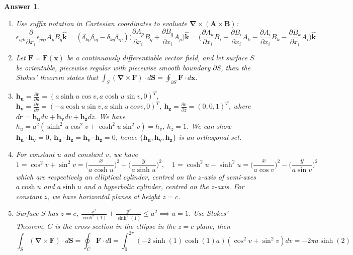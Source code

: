 \documentclass[a4paper]{article}
\newtheorem{ans}{Answer}[section]
\theoremstyle{new}
\begin{document}
\begin{ans}\leavevmode
\begin{enumerate}[label=(\alph*)]
    \item Use suffix notation in Cartesian coordinates to evaluate $\boldsymbol{\nabla}\times(\mathbf{A}\times\mathbf{B})$:
$$\epsilon_{ijk}\frac{\partial}{\partial x_i}\epsilon_{pqj}A_pB_q\mathbf{\hat{k}}=(\delta_{kp}\delta_{iq}-\delta_{kq}\delta_{ip})\bigg(\frac{\partial A_p}{\partial x_i}B_q+\frac{\partial B_q}{\partial x_i}A_p\bigg)\mathbf{\hat{k}}=\bigg(\frac{\partial A_k}{\partial x_i}B_i+\frac{\partial B_i}{\partial x_i}A_k-\frac{\partial A_i}{\partial x_i}B_k-\frac{\partial B_k}{\partial x_i}A_i\bigg)\mathbf{\hat{k}}$$
\item Let $\mathbf{F}=\mathbf{F}(\mathbf{x})$ be a continuously differentiable vector field, and let surface $S$ be orientable, piecewise regular with piecewise smooth boundary $\partial S$, then the Stokes' theorem states that $\int_S(\boldsymbol{\nabla}\times\mathbf{F})\cdot d\mathbf{S}=\oint_{\partial S}\mathbf{F}\cdot d\mathbf{x}$.
\item $\mathbf{h_u}=\frac{\partial\mathbf{r}}{\partial u}=(a\sinh u\cos v,a\cosh u\sin v,0)^T$, $\mathbf{h_v}=\frac{\partial\mathbf{r}}{\partial v}=(-a\cosh u\sin v,a\sinh u\ cos v,0)^T$, $\mathbf{h_z}=\frac{\partial\mathbf{r}}{\partial z}=(0,0,1)^T$, where $d\mathbf{r}=\mathbf{h_u}du+\mathbf{h_v}dv+\mathbf{h_z}dz$. We have $h_u=a^2(\sinh^2u\cos^2v+\cosh^2u\sin^2v)=h_v$, $h_z=1$. We can show $\mathbf{h_u}\cdot\mathbf{h_v}=0$, $\mathbf{h_u}\cdot\mathbf{h_z}=\mathbf{h_v}\cdot\mathbf{h_z}=0$, hence $\{\mathbf{h_u},\mathbf{h_v},\mathbf{h_z}\}$ is an orthogonal set.
\item For constant $u$ and constant $v$, we have
$$1=\cos^2v+\sin^2v=\bigg(\frac{x}{a\cosh u}\bigg)^2+\bigg(\frac{y}{a\sinh u}\bigg)^2,\quad 1=\cosh^2u-\sinh^2u=\bigg(\frac{x}{a\cos v}\bigg)^2-\bigg(\frac{y}{a\sin v}\bigg)^2$$
which are respectively an elliptical cylinder, centred on the $z$-axis of semi-axes $a\cosh u$ and $a\sinh u$ and a hyperbolic cylinder, centred on the $z$-axis. For constant $z$, we have horizontal planes at height $z=c$.
\item Surface $S$ has $z=c$, $\frac{x^2}{\cosh^2(1)}+\frac{y^2}{\sinh^2(1)}\leq a^2\implies u=1$. Use Stokes' Theorem, $C$ is the cross-section in the ellipse in the $z=c$ plane, then
$$\int_S(\boldsymbol{\nabla}\times\mathbf{F})\cdot d\mathbf{S}=\oint_C\mathbf{F}\cdot d\mathbf{l}=\int_0^{2\pi}(-2\sinh(1)\cosh(1)a)(\cos^2v+\sin^2v)dv=-2\pi a \sinh(2)$$
\end{enumerate}
\end{ans}
\end{document}
